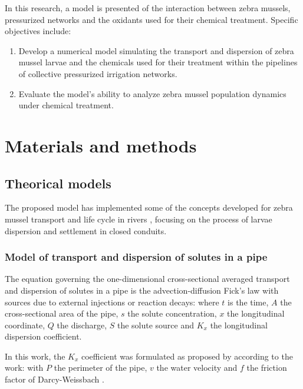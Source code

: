 \documentclass[review,authoryear]{elsarticle}
\begin{document}
In this research, a model is presented of the interaction between zebra mussels,
pressurized networks and the oxidants used for their chemical treatment.
Specific objectives include:
\begin{enumerate}
	\item Develop a numerical model simulating the transport and dispersion
		of zebra mussel larvae and the chemicals used for their
		treatment within the pipelines of collective pressurized
		irrigation networks.
	\item Evaluate the model's ability to analyze zebra mussel population
		dynamics under chemical treatment.
\end{enumerate}

\section{Materials and methods}

\subsection{Theorical models}

The proposed model has implemented some of the concepts developed for zebra
mussel transport and life cycle in rivers \citep{Wu10,Huang17,JinZhao21},
focusing on the process of larvae dispersion and settlement in closed conduits.

\subsubsection{Model of transport and dispersion of solutes in a pipe}

The equation governing the one-dimensional cross-sectional averaged transport
and dispersion of solutes in a pipe is the advection-diffusion Fick's law with
sources due to external injections or reaction decays:
where $t$ is the time, $A$ the cross-sectional area of the pipe, $s$ the solute
concentration, $x$ the longitudinal coordinate, $Q$ the discharge, $S$ the
solute source and $K_x$ the longitudinal dispersion coefficient.

In this work,  the $K_x$ coefficient was formulated as proposed by
\citet{JaviTrans} according to the \citet{Rutherford94} work: 
with $P$ the perimeter of the pipe, $v$ the water velocity and $f$ the friction
factor of Darcy-Weissbach \citep{Darcy58}.
\end{document}
